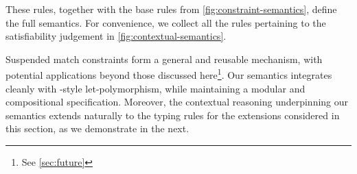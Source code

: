 \documentclass[acmsmall,screen,nonacm]{acmart}
\begin{document}
These rules, together with the base rules from
\cref{fig:constraint-semantics}, define the full semantics. For convenience,
we collect all the rules pertaining to the satisfiability judgement in
\cref{fig:contextual-semantics}.

Suspended match constraints form a general and reusable mechanism, with
potential applications beyond those discussed here\footnote{See
\cref{sec:future}}. Our semantics integrates cleanly with \ML-style
let-polymorphism, while maintaining a modular and compositional specification.
Moreover, the contextual reasoning underpinning our semantics extends naturally
to the typing rules for the \ML extensions considered in this section, as
we demonstrate in the next.

\end{document}
